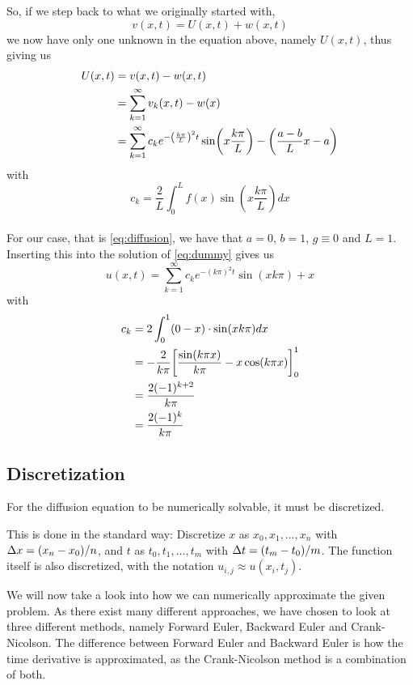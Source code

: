 \documentclass[12pt,english,a4paper]{article}
\begin{document}
So, if we step back to what we originally started with,
\[
v(x,t) = U(x,t) + w(x,t)
\]
we now have only one unknown in the equation above, namely \(U(x,t)\), thus giving us
\begin{align*}
 U(x,t) &= v(x,t)- w(x,t) \\
 &=  \sum_{k=1}^\infty v_k(x,t) - w(x) \\
 &=\sum_{k=1}^\infty c_ke^{-\qty(\frac{k \pi}{L})^2t}\sin(x\frac{k \pi}{L})  -\qty(\frac{a-b}{L}x - a)
\end{align*}
with
\[
c_k = \frac{2}{L}\int_0^Lf(x)\sin(x\frac{k \pi}{L})dx
\]
\hfill \\
For our case, that is \vref{eq:diffusion}, we have that \(a = 0\), \(b = 1\), \(g \equiv 0\) and \(L = 1\). Inserting this into the solution of \vref{eq:dummy} gives us
\begin{equation}\label{eq:analyticalSolution}
	u(x,t) = \sum_{k=1}^\infty c_ke^{-(k\pi)^2t}\sin(xk\pi)  + x
\end{equation}
with
\begin{align*}
c_k &= 2\int_0^1(0-x)\cdot\sin(xk\pi)dx \\
&= - \frac{2}{k\pi}\qty[\frac{\sin(k\pi x)}{k\pi} - x\cos(k\pi x)]_0^1 \\
&= \frac{2(-1)^{k+2}}{k\pi} \\
&=  \frac{2(-1)^k}{k\pi}
\end{align*}

\subsection{Discretization}


For the diffusion equation to be numerically solvable, it must be discretized.

This is done in the standard way: Discretize \(x\) as \(x_0,x_1,\dots,x_n\) with \(\Delta x=\qty(x_n-x_0)/n\), and \(t\) as \(t_0,t_1,\dots,t_m\) with \(\Delta t = \qty(t_m-t_0)/m\). The function itself is also discretized, with the notation \(u_{i,j} \approx u(x_i,t_j)\).

We will now take a look into how we can numerically approximate the given problem. As there exist many different approaches, we have chosen to look at three different methods, namely Forward Euler, Backward Euler and Crank-Nicolson. The difference between Forward Euler and Backward Euler is how the time derivative is approximated, as the Crank-Nicolson method is a combination of both.
%
\end{document}
